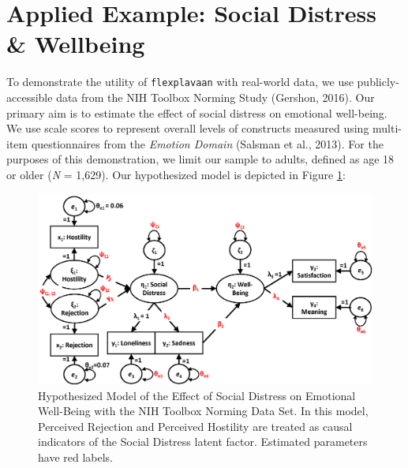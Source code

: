 \documentclass[
  english,
  man]{apa6}
\begin{document}
\hypertarget{applied-example-social-distress-wellbeing}{%
\section{Applied Example: Social Distress \& Wellbeing}\label{applied-example-social-distress-wellbeing}}

To demonstrate the utility of \texttt{flexplavaan} with real-world data, we use publicly-accessible data from the NIH Toolbox Norming Study (Gershon, 2016). Our primary aim is to estimate the effect of social distress on emotional well-being. We use scale scores to represent overall levels of constructs measured using multi-item questionnaires from the \emph{Emotion Domain} (Salsman et al., 2013). For the purposes of this demonstration, we limit our sample to adults, defined as age 18 or older (\emph{N} = 1,629). Our hypothesized model is depicted in Figure \ref{fig:toolbox1}:

\begin{figure}

{\centering \includegraphics[width=0.8\linewidth]{toolboxDiagramPrimary} 

}

\caption{Hypothesized Model of the Effect of Social Distress on Emotional Well-Being with the NIH Toolbox Norming Data Set. In this model, Perceived Rejection and Perceived Hostility are treated as causal indicators of the Social Distress latent factor. Estimated parameters have red labels.}\label{fig:toolbox1}
\end{figure}
\end{document}
